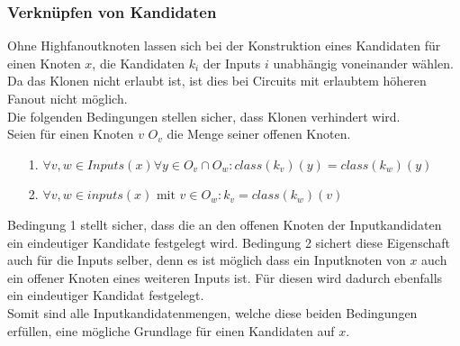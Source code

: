 \documentclass[11pt, a4paper, german]{article}
\begin{document}
\subsubsection{Verknüpfen von Kandidaten}
Ohne Highfanoutknoten lassen sich bei der Konstruktion eines Kandidaten für einen Knoten $x$, die Kandidaten $k_i$ der Inputs $i$ unabhängig voneinander wählen.\\
Da das Klonen nicht erlaubt ist, ist dies bei Circuits mit erlaubtem höheren Fanout nicht möglich.\\
Die folgenden Bedingungen stellen sicher, dass Klonen verhindert wird. \\
Seien für einen Knoten $v$ $O_v$ die Menge seiner offenen Knoten.
\begin{itemize}
	\item[1.] $\forall v,w \in Inputs(x) \forall y \in O_v \cap O_w : class(k_v)(y) = class(k_w)(y)$
	\item[2.] $\forall v,w \in inputs(x) \text{ mit } v \in O_w : k_v = class(k_w)(v)$
\end{itemize}
Bedingung 1 stellt sicher, dass die an den offenen Knoten der Inputkandidaten ein eindeutiger Kandidate festgelegt wird. Bedingung 2 sichert diese Eigenschaft auch für die Inputs selber, denn es ist möglich dass ein Inputknoten von $x$ auch ein offener Knoten eines weiteren Inputs ist. Für diesen wird dadurch ebenfalls ein eindeutiger Kandidat festgelegt. \\
Somit sind alle Inputkandidatenmengen, welche diese beiden Bedingungen erfüllen, eine mögliche Grundlage für einen Kandidaten auf $x$.
\end{document}
